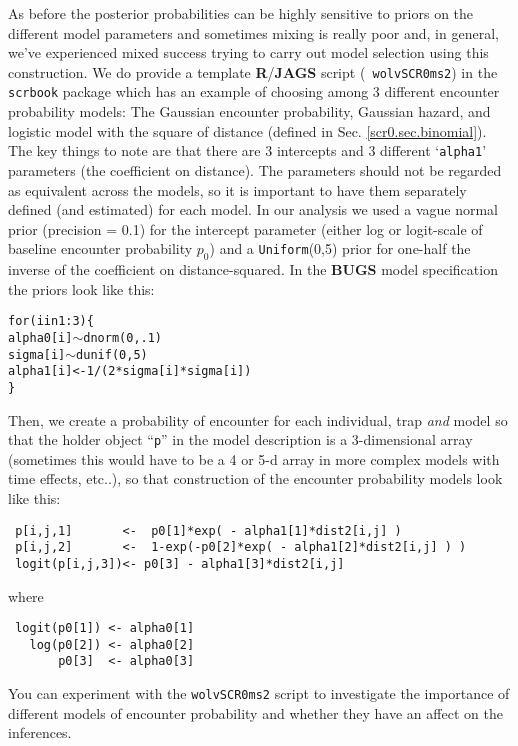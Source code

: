 As before the posterior probabilities can be highly sensitive to
priors on the different model parameters and sometimes mixing is
really poor and, in general, we've experienced mixed success trying to
carry out model selection using this construction.
We do provide a template {\bf R}/{\bf JAGS} script (\mbox{\tt
  wolvSCR0ms2}) in the \mbox{\tt scrbook} package which has an
example of choosing among 3 different encounter probability
models:
The Gaussian encounter probability, Gaussian hazard, and logistic
model with the square of distance (defined in Sec. \ref{scr0.sec.binomial}). The key things to note are that
there are 3 intercepts and 3 different `\mbox{\tt alpha1}' parameters
(the coefficient on distance). The parameters should not be regarded
as equivalent across the models, so it is important to have them
separately defined (and estimated) for each model.  In our analysis we
used a vague normal prior (precision = 0.1) for the intercept
parameter (either log or logit-scale of baseline encounter probability
$p_{0}$) and a \mbox{\tt Uniform}(0,5) prior for one-half the inverse of the
coefficient on distance-squared.
In the {\bf BUGS} model specification the priors look like this:
\begin{alltt}
 for(i in 1:3)\{
   alpha0[i] \(\sim\) dnorm(0,.1)
   sigma[i] \(\sim\) dunif(0,5)
   alpha1[i] <- 1/(2*sigma[i]*sigma[i])
 \}
\end{alltt}
Then,  we create a probability of encounter for each
individual, trap {\it and} model so that the holder object ``\mbox{\tt p}'' in the
model description is a 3-dimensional array (sometimes this would have to be a 4
or 5-d array in more complex models with time effects, etc..), so that
construction of the encounter probability models look like this:
\begin{verbatim}
 p[i,j,1]       <-  p0[1]*exp( - alpha1[1]*dist2[i,j] )
 p[i,j,2]       <-  1-exp(-p0[2]*exp( - alpha1[2]*dist2[i,j] ) )
 logit(p[i,j,3])<- p0[3] - alpha1[3]*dist2[i,j]
\end{verbatim}
where
\begin{verbatim}
 logit(p0[1]) <- alpha0[1]
   log(p0[2]) <- alpha0[2]
       p0[3]  <- alpha0[3]
\end{verbatim}
You can experiment with the \mbox{\tt wolvSCR0ms2} script to
investigate the importance of different models of encounter
probability and whether they have an affect on the inferences.









